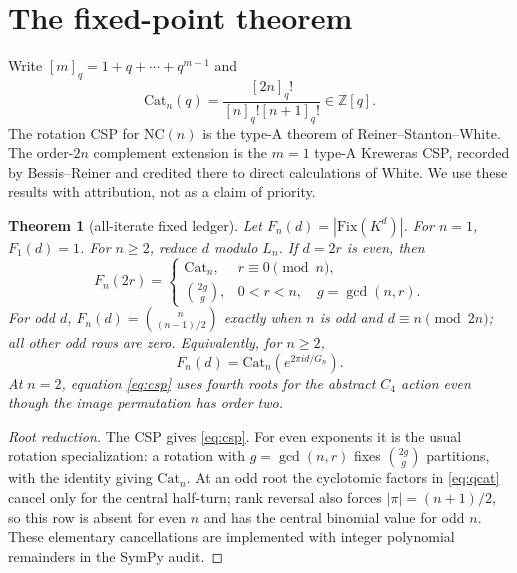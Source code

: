 \documentclass[11pt]{article}
\newtheorem{theorem}{Theorem}[section]
\theoremstyle{definition}
\newcommand{\NC}{\mathrm{NC}}
\newcommand{\Cat}{\mathrm{Cat}}
\newcommand{\Fix}{\mathrm{Fix}}
\begin{document}
\section{The fixed-point theorem}

Write $[m]_q=1+q+\cdots+q^{m-1}$ and
\begin{equation}
 \Cat_n(q)=\frac{[2n]_q!}{[n]_q![n+1]_q!}\in\mathbb Z[q].       \label{eq:qcat}
\end{equation}
The rotation CSP for $\NC(n)$ is the type-A theorem of
Reiner--Stanton--White.  The order-$2n$ complement extension is the $m=1$
type-A Kreweras CSP, recorded by Bessis--Reiner and credited there to direct
calculations of White.  We use these results with attribution, not as a claim
of priority.

\begin{theorem}[all-iterate fixed ledger]\label{thm:fixed}
Let $F_n(d)=|\Fix(K^d)|$.  For $n=1$, $F_1(d)=1$.  For $n\ge2$, reduce $d$
modulo $L_n$.  If $d=2r$ is even, then
\begin{equation}
 F_n(2r)=\begin{cases}
 \Cat_n,&r\equiv0\pmod n,\\
 \binom{2g}{g},&0<r<n,\quad g=\gcd(n,r).
 \end{cases}                                             \label{eq:even-fixed}
\end{equation}
For odd $d$, $F_n(d)=\binom{n}{(n-1)/2}$ exactly when $n$ is odd and
$d\equiv n\pmod{2n}$; all other odd rows are zero.
Equivalently, for $n\ge2$,
\begin{equation}
 F_n(d)=\Cat_n\!\left(e^{2\pi i d/G_n}\right).             \label{eq:csp}
\end{equation}
At $n=2$, equation \eqref{eq:csp} uses fourth roots for the abstract $C_4$
action even though the image permutation has order two.
\end{theorem}

\begin{proof}[Root reduction]
The CSP gives \eqref{eq:csp}.  For even exponents it is the usual rotation
specialization: a rotation with $g=\gcd(n,r)$ fixes $\binom{2g}{g}$ partitions,
with the identity giving $\Cat_n$.  At an odd root the cyclotomic factors in
\eqref{eq:qcat} cancel only for the central half-turn; rank reversal also
forces $|\pi|=(n+1)/2$, so this row is absent for even $n$ and has the central
binomial value for odd $n$.  These elementary cancellations are implemented
with integer polynomial remainders in the SymPy audit.
\end{proof}
\end{document}
